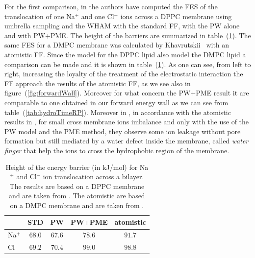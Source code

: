 For the first comparison, in \cite{PW} the authors have computed the \ac{FES} of the translocation of one Na$^+$ and one Cl$^-$ ions across a \acs{DPPC} membrane using umbrella sampling and the \ac{WHAM} with the standard \martini \ac{FF}, with the \ac{PW} alone and with \ac{PW}$+$\ac{PME}. The height of the barriers are summarized in table~(\ref{tab:ionTranslocation}). The same \ac{FES} for a \acs{DMPC} membrane was calculated by Khavrutskii \etal\, \cite{atomisticTranslocation} with an atomistic \ac{FF}. Since the \martini model for the \acs{DPPC} lipid also model the \acs{DMPC} lipid a comparison can be made and it is shown in table~(\ref{tab:ionTranslocation}). As one can see, from left to right, increasing the loyalty of the treatment of the electrostatic interaction the \martini \ac{FF} approach the results of the atomistic \ac{FF}, as we see also in figure~(\ref{fig:forwardWall}). Moreover for what concern the \ac{PW}$+$\ac{PME} result it are comparable to one obtained in our forward energy wall as we can see from table~(\ref{tab:hydroTimeRP}). Moreover in \cite{PW}, in accordance with the atomistic results in \cite{atomisticTranslocation}, for small cross membrane ions imbalance and only with the use of the \ac{PW} model and the \ac{PME} method, they observe some ion leakage without pore formation but still mediated by a water defect inside the membrane, called \textit{water finger} that help the ions to cross the hydrophobic region of the membrane.
\begin{table}[h!t]
	\centering
	\begin{tabular}{lcccc}
		\toprule	
		\,		& STD 	& \acs{PW} 	& \acs{PW}$+$\acs{PME} 	& atomistic	\\ \toprule
		Na$^+$	& $68.0$& $67.6$	& $78.6$				& $91.7$ 	\\ \midrule
		Cl$^-$	& $69.2$& $70.4$	& $99.0$				& $98.8$	\\ \bottomrule
	\end{tabular}
	\caption{Height of the energy barrier (in kJ/mol) for Na$^+$ and Cl$^-$ ion translocation across a bilayer. The \martini results are based on a \acs{DPPC} membrane and are taken from \cite{PW}. The atomistic are based on a \acs{DMPC} membrane and are taken from \cite{atomisticTranslocation}.}
	\label{tab:ionTranslocation}
\end{table}

